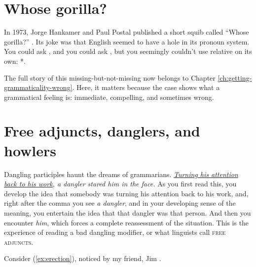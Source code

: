 


\section{Whose gorilla?}

In 1973, Jorge Hankamer and Paul Postal published a short squib called \enquote{Whose gorilla?} \citep{Hankamer1973}. Its joke was that English seemed to have a hole in its pronoun system. You could ask , and you could ask , but you seemingly couldn't use relative  on its own: *.

The full story of this missing-but-not-missing  now belongs to Chapter \ref{ch:getting-grammaticality-wrong}. Here, it matters because the case shows what a grammatical feeling is: immediate, compelling, and sometimes wrong.


\section{Free adjuncts, danglers, and howlers}

Dangling participles haunt the dreams of grammarians. \textit{\uline{Turning his attention back to his work}, a dangler stared him in the face.} As you first read this, you develop the idea that somebody was turning his attention back to his work, and, right after the comma you see \textit{a dangler}, and in your developing sense of the meaning, you entertain the idea that that dangler was that person. And then you encounter \textit{him}, which forces a complete reassessment of the situation. This is the experience of reading a bad dangling modifier, or what linguists call \textsc{free adjuncts}.

Consider (\ref{ex:erection}), noticed by my friend, Jim \citet{Donaldson2020}.

